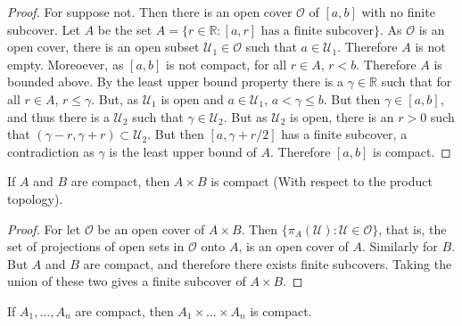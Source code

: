 \documentclass[crop=false,class=article,oneside]{standalone}
\begin{document}
        \begin{proof}
            For suppose not. Then there is an open
            cover $\mathcal{O}$ of $[a,b]$ with no finite
            subcover. Let $A$ be the set
            $A=\{r\in\mathbb{R}:[a,r]%
                 \textrm{ has a finite subcover}\}$.
            As $\mathcal{O}$ is an open cover, there is
            an open subset $\mathcal{U}_{1}\in\mathcal{O}$ such
            that $a\in\mathcal{U}_{1}$. Therefore $A$ is
            not empty. Moreoever, as $[a,b]$ is not compact,
            for all $r\in{A}$, $r<b$. Therefore $A$ is bounded
            above. By the least upper bound property there
            is a $\gamma\in\mathbb{R}$ such that for
            all $r\in{A}$, $r\leq\gamma$. But, as
            $\mathcal{U}_{1}$ is open and $a\in\mathcal{U}_{1}$,
            $a<\gamma\leq{b}$. But then $\gamma\in[a,b]$, and
            thus there is a $\mathcal{U}_{2}$ such that
            $\gamma\in\mathcal{U}_{2}$. But as
            $\mathcal{U}_{2}$ is open, there is an $r>0$ such
            that $(\gamma-r,\gamma+r)\subset\mathcal{U}_{2}$.
            But then $[a,\gamma+r/2]$ has a finite subcover,
            a contradiction as $\gamma$ is the least upper bound
            of $A$. Therefore $[a,b]$ is compact.
        \end{proof}
        \begin{theorem}
            \label{%
                theorem:surgery_theory_%
                product_of_compact_is_compact
            }
            If $A$ and $B$ are compact, then
            $A\times{B}$ is compact (With respect to the
            product topology).
        \end{theorem}
        \begin{proof}
            For let $\mathcal{O}$ be an open cover
            of $A\times{B}$.  Then
            $\{\pi_{A}(\mathcal{U}):\mathcal{U}\in\mathcal{O}\}$,
            that is, the set of projections of open sets in
            $\mathcal{O}$ onto $A$, is an open cover of $A$.
            Similarly for $B$. But $A$ and $B$ are compact, and
            therefore there exists finite subcovers. Taking the
            union of these two gives
            a finite subcover of $A\times{B}$.
        \end{proof}
        \begin{theorem}
            \label{%
                theorem:surgery_theory_finite_%
                product_of_compact_is_compact%
            }
            If $A_{1},\hdots,A_{n}$ are compact,
            then $A_{1}\times\hdots\times{A_{n}}$ is compact.
        \end{theorem}
\end{document}

